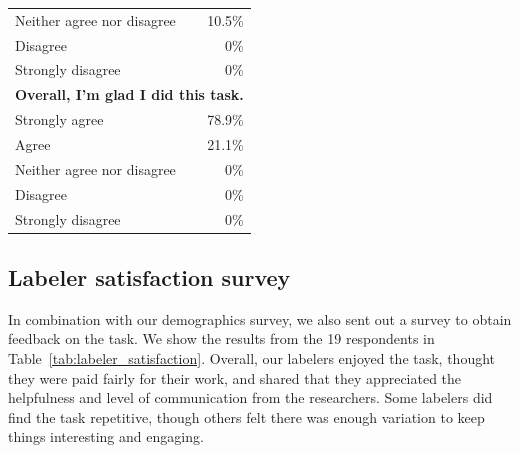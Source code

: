 \documentclass{article}
\begin{document}
\begin{table}[]
\begin{tabular}{l r}
         Neither agree nor disagree  & 10.5\% \\
         Disagree & 0\% \\
         Strongly disagree  & 0\% \\ \midrule
         \multicolumn{2}{c}{\textbf{Overall, I'm glad I did this task.}}\\
         Strongly agree & 78.9\% \\
         Agree & 21.1\% \\
         Neither agree nor disagree  & 0\% \\
         Disagree & 0\% \\
         Strongly disagree  & 0\% \\
         \bottomrule
    \end{tabular}
\end{table}


\subsection{Labeler satisfaction survey}
In combination with our demographics survey, we also sent out a survey to obtain feedback on the task. We show the results from the 19 respondents in Table~\ref{tab:labeler_satisfaction}. Overall, our labelers enjoyed the task, thought they were paid fairly for their work, and shared that they appreciated the helpfulness and level of communication from the researchers. Some labelers did find the task repetitive, though others felt there was enough variation to keep things interesting and engaging.
\end{document}
